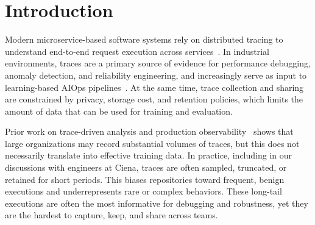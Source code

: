 \documentclass[sigconf,review]{acmart}
\begin{document}
\maketitle




\section{Introduction}
\label{intro}

Modern microservice-based software systems rely on distributed tracing to understand end-to-end request execution across services~\cite{li2022enjoy}. In industrial environments, traces are a primary source of evidence for performance debugging, anomaly detection, and reliability engineering, and increasingly serve as input to learning-based AIOps pipelines~\cite{sambasivan2013diagnosing}. At the same time, trace collection and sharing are constrained by privacy, storage cost, and retention policies, which limits the amount of data that can be used for training and evaluation.

Prior work on trace-driven analysis and production observability~\cite{9019687,alzubaidi2023survey} shows that large organizations may record substantial volumes of traces, but this does not necessarily translate into effective training data. In practice, including in our discussions with engineers at Ciena, traces are often sampled, truncated, or retained for short periods. This biases repositories toward frequent, benign executions and underrepresents rare or complex behaviors. These long-tail executions are often the most informative for debugging and robustness, yet they are the hardest to capture, keep, and share across teams.

\end{document}
